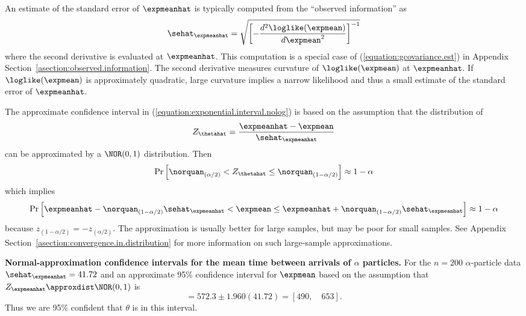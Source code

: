 An estimate of the standard error of 
$\expmeanhat$ is typically computed from the
``observed information'' as
\begin{equation}
\label{equation:scalar.hessian}
 \sehat_{\expmeanhat} = 
\sqrt{ \left[-\frac{d^{2} \loglike(\expmean)}
{d \expmean^{2}} \right]^{-1}}
\end{equation}
where the second derivative is evaluated at $\expmeanhat$.  This
computation is a special case of (\ref{equation:gcovariance.est}) in
Appendix Section~\ref{asection:observed.information}.  The second derivative
measures curvature of $\loglike(\expmean)$ at $\expmeanhat$. If
$\loglike(\expmean)$ is approximately quadratic, large curvature
implies a narrow likelihood and thus a small estimate of the standard
error of $\expmeanhat$.

The approximate confidence interval in
(\ref{equation:exponential.interval.nolog}) is based on the 
assumption that the distribution of
\begin{equation}
\label{equation:z.theta.exp}
Z_{\thetahat} = \frac{\expmeanhat-\expmean}{\sehat_{\expmeanhat}}
\end{equation}
can be approximated by a $\NOR(0,1)$ distribution.
Then 
\begin{equation}
\label{equation:zthetahat.normal}
\Pr \left[ \norquan_{(\alpha/2)} < Z_{\thetahat}  \leq
	\norquan_{(1-\alpha/2)} \right]	\approx 1-\alpha
\end{equation}
which implies
\begin{equation}
\label{equation:theta.ci.normal}
\Pr \left[  \expmeanhat - \norquan_{(1-\alpha/2)} \sehat_{\expmeanhat}
	 <
	\expmean \leq
	 \expmeanhat + \norquan_{(1-\alpha/2)} \sehat_{\expmeanhat}\right]
	\approx 1-\alpha
\end{equation}
because $z_{(1-\alpha/2)}=-z_{(\alpha/2)}$.
The approximation is usually better for large samples, but may be poor
for small samples.  See Appendix
Section~\ref{asection:convergence.in.distribution} for more
information on such large-sample approximations.

\begin{example}
{\bf Normal-approximation confidence intervals for the
mean time between arrivals of $\alpha$ particles.}
For the $n=200$ $\alpha$-particle data 
$\sehat_{\expmeanhat} = 41.72$ and an approximate 95\% confidence 
interval for $\expmean$ based on the assumption that  
$Z_{\expmeanhat} \approxdist \NOR(0,1)$ is
\begin{displaymath}
 [ \undertilde{\expmean}, \quad \tilde{\expmean}] =
572.3 \pm 1.960 (41.72) = [490, \quad 653].
\end{displaymath}
Thus we are 95\% confident that $\theta$ is in this interval.
\end{example}

